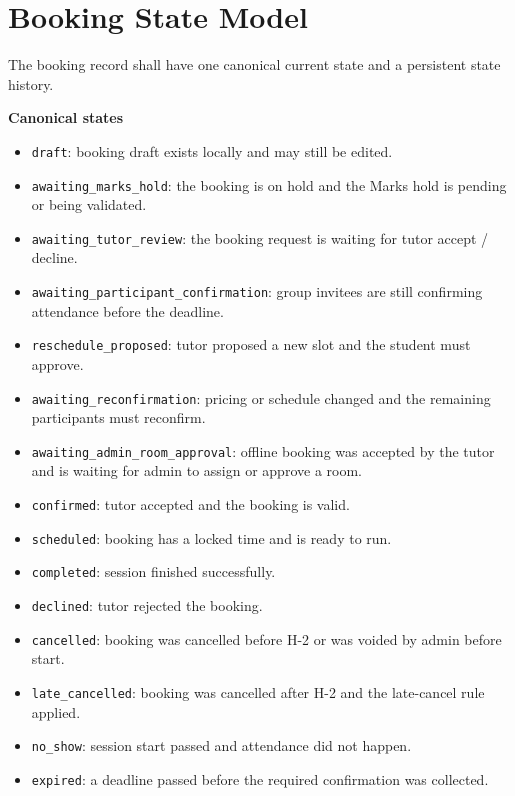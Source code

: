 \documentclass[11pt,a4paper]{article}
\begin{document}
\section{Booking State Model}

The booking record shall have one canonical current state and a persistent state history.

\textbf{Canonical states}
\begin{itemize}
	\item \texttt{draft}: booking draft exists locally and may still be edited.
	\item \texttt{awaiting\_marks\_hold}: the booking is on hold and the Marks hold is pending or being validated.
	\item \texttt{awaiting\_tutor\_review}: the booking request is waiting for tutor accept / decline.
	\item \texttt{awaiting\_participant\_confirmation}: group invitees are still confirming attendance before the deadline.
	\item \texttt{reschedule\_proposed}: tutor proposed a new slot and the student must approve.
	\item \texttt{awaiting\_reconfirmation}: pricing or schedule changed and the remaining participants must reconfirm.
	\item \texttt{awaiting\_admin\_room\_approval}: offline booking was accepted by the tutor and is waiting for admin to assign or approve a room.
	\item \texttt{confirmed}: tutor accepted and the booking is valid.
	\item \texttt{scheduled}: booking has a locked time and is ready to run.
	\item \texttt{completed}: session finished successfully.
	\item \texttt{declined}: tutor rejected the booking.
	\item \texttt{cancelled}: booking was cancelled before H-2 or was voided by admin before start.
	\item \texttt{late\_cancelled}: booking was cancelled after H-2 and the late-cancel rule applied.
	\item \texttt{no\_show}: session start passed and attendance did not happen.
	\item \texttt{expired}: a deadline passed before the required confirmation was collected.
\end{itemize}
\end{document}
